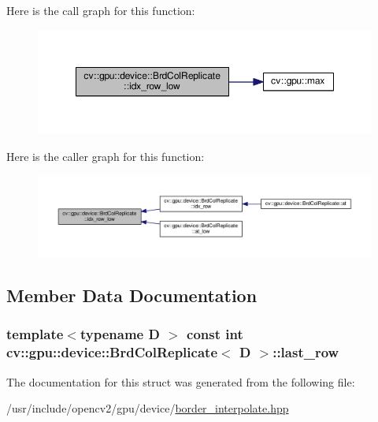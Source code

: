 Here is the call graph for this function\-:\nopagebreak
\begin{figure}[H]
\begin{center}
\leavevmode
\includegraphics[width=350pt]{structcv_1_1gpu_1_1device_1_1BrdColReplicate_aeb1ab4a731b0a9087d5f4be60090da6d_cgraph}
\end{center}
\end{figure}




Here is the caller graph for this function\-:\nopagebreak
\begin{figure}[H]
\begin{center}
\leavevmode
\includegraphics[width=350pt]{structcv_1_1gpu_1_1device_1_1BrdColReplicate_aeb1ab4a731b0a9087d5f4be60090da6d_icgraph}
\end{center}
\end{figure}




\subsection{Member Data Documentation}
\hypertarget{structcv_1_1gpu_1_1device_1_1BrdColReplicate_a14918d54ca488703d34aa59ba076acb5}{
\subsubsection[{last\-\_\-row}]{\setlength{\rightskip}{0pt plus 5cm}template$<$typename D $>$ const int {\bf cv\-::gpu\-::device\-::\-Brd\-Col\-Replicate}$<$ D $>$\-::last\-\_\-row}}\label{structcv_1_1gpu_1_1device_1_1BrdColReplicate_a14918d54ca488703d34aa59ba076acb5}


The documentation for this struct was generated from the following file\-:\begin{DoxyCompactItemize}
\item 
/usr/include/opencv2/gpu/device/\hyperlink{border__interpolate_8hpp}{border\-\_\-interpolate.\-hpp}\end{DoxyCompactItemize}
